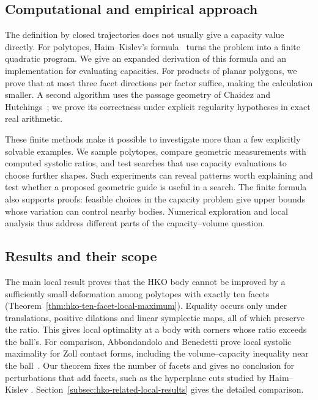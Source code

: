 \subsection{Computational and empirical approach}

The definition by closed trajectories does not usually give a capacity
value directly. For polytopes, Haim--Kislev's formula~\cite{HK2017}
turns the problem into a finite quadratic program. We give an expanded
derivation of this formula and an implementation for evaluating capacities.
For products of planar polygons, we prove that at most three facet
directions per factor suffice, making the calculation smaller. A second algorithm
uses the passage geometry of Chaidez and Hutchings~\cite{CH2021}; we prove
its correctness under explicit regularity hypotheses in exact real
arithmetic.

These finite methods make it possible to investigate more than a few
explicitly solvable examples. We sample polytopes, compare geometric
measurements with computed systolic ratios, and test searches that use
capacity evaluations to choose further shapes. Such experiments can reveal
patterns worth explaining and test whether a proposed geometric guide is
useful in a search. The finite formula also supports proofs: feasible
choices in the capacity problem give upper bounds whose variation can
control nearby bodies. Numerical exploration and local analysis thus
address different parts of the capacity--volume question.

\subsection{Results and their scope}

The main local result proves that the HKO body cannot be improved by a
sufficiently small deformation among polytopes with exactly ten facets
(Theorem~\ref{thm:hko-ten-facet-local-maximum}). Equality occurs only under
translations, positive dilations and linear symplectic maps, all of which
preserve the ratio. This gives local optimality at a body with corners
whose ratio exceeds the ball's. For comparison, Abbondandolo and Benedetti
prove local systolic maximality for Zoll contact forms, including the
volume--capacity inequality near the ball~\cite{AB2023}. Our theorem
fixes the number of facets and gives no conclusion for perturbations that
add facets, such as the hyperplane cuts studied by Haim--Kislev
\cite{HaimKislev2025Zoll}. Section~\ref{subsec:hko-related-local-results}
gives the detailed comparison.

